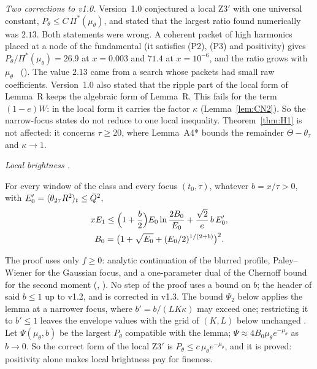 \emph{Two corrections to v1.0.}
Version~1.0 conjectured a local Z3$'$ with one universal constant, $P_\theta\le C\,\Pi^*(\mu_\theta)$, and stated that the largest ratio found numerically was $2.13$.
Both statements were wrong.
A coherent packet of high harmonics placed at a node of the fundamental (it satisfies (P2), (P3) and positivity) gives $P_\theta/\Pi^*(\mu_\theta)=26.9$ at $x=0.003$ and $71.4$ at $x=10^{-6}$, and the ratio grows with $\mu_\theta$ \numst\ ().
The value $2.13$ came from a search whose packets had small raw coefficients.
Version~1.0 also stated that the ripple part of the local form of Lemma~R keeps the algebraic form of Lemma~R.
This fails for the term $(1-e)W$: in the local form it carries the factor $\kappa$ (Lemma~\ref{lem:CN2}).
So the narrow-focus states do not reduce to one local inequality.
Theorem~\ref{thm:H1} is not affected: it concerns $\tau\ge20$, where Lemma~A4* bounds the remainder $\Theta-\theta_\tau$ and $\kappa\to1$.

\emph{Local brightness \proofst.}
\begin{lemma} \proofst
\label{lem:CM1}
For every window of the class and every focus $(t_0,\tau)$, whatever $b=x/\tau>0$, with $E_0'=\langle\theta_{2\tau}R^2\rangle_t\le\bar Q^2$,
\begin{multline}
xE_1\le\Bigl(1+\frac b2\Bigr)E_0\ln\frac{2B_0}{E_0}+\frac{\sqrt2}{e}\,b\,E_0',\\
B_0=\bigl(1+\sqrt{E_0}+(E_0/2)^{1/(2+b)}\bigr)^2 .
\end{multline}
\end{lemma}
The proof uses only $f\ge0$: analytic continuation of the blurred profile, Paley--Wiener for the Gaussian focus, and a one-parameter dual of the Chernoff bound for the second moment (, ).
No step of the proof uses a bound on $b$; the header of  said $b\le1$ up to v1.2, and is corrected in v1.3.
The bound $\Psi_2$ below applies the lemma at a narrower focus, where $b'=b/(LK\kappa)$ may exceed one; restricting it to $b'\le1$ leaves the envelope values with the grid of $(K,L)$ below unchanged \numst.
Let $\Psi(\mu_\theta,b)$ be the largest $P_\theta$ compatible with the lemma; $\Psi\approx4B_0\mu_\theta e^{-\mu_\theta}$ as $b\to0$.
So the correct form of the local Z3$'$ is $P_\theta\le c\,\mu_\theta e^{-\mu_\theta}$, and it is proved: positivity alone makes local brightness pay for fineness.

